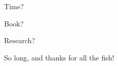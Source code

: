 \documentclass[aspectratio=169, handout]{beamer}
\begin{document}
\begin{frame}
    \Huge{\centerline{Time?}}
\end{frame}

\begin{frame}
        \Huge{\centerline{Book?}}
\end{frame}

\begin{frame}
        \Huge{\centerline{Research?}}
\end{frame}




\begin{frame}
  \begin{center}
    {\color{sigma@mainblue} So long, and thanks for all the fish!}
  \end{center}
\end{frame}
\end{document}
